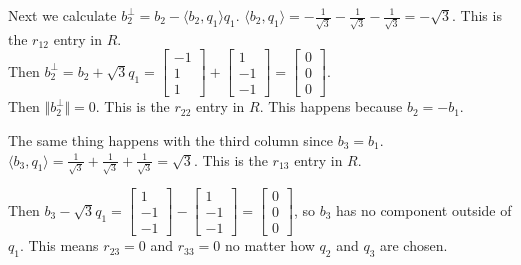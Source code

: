 \documentclass[11pt]{article}
\begin{document}
\noindent Next we calculate $b_2^{\perp}=b_2-\langle b_2,q_1\rangle q_1$. \quad $\langle b_2,q_1\rangle=-\frac{1}{\sqrt3}-\frac{1}{\sqrt3}-\frac{1}{\sqrt3} = -\sqrt3$. This is the $r_{12}$ entry in $R$.\\
Then $b_2^{\perp} = b_2+\sqrt3q_1=\begin{bmatrix}
    -1\\1\\1
\end{bmatrix}+\begin{bmatrix}
    1\\-1\\-1
\end{bmatrix}= \begin{bmatrix}
    0\\0\\0
\end{bmatrix}$.\\ 
Then $\Vert b_2^{\perp} \Vert = 0$. This is the $r_{22}$ entry in $R$. This happens because $b_2 = -b_1$.\\
\medskip

\noindent The same thing happens with the third column since $b_3 = b_1$.\\
$\langle b_3,q_1\rangle=\frac{1}{\sqrt3}+\frac{1}{\sqrt3}+\frac{1}{\sqrt3} = \sqrt3$. This is the $r_{13}$ entry in $R$.

\noindent Then $b_3 - \sqrt3q_1=\begin{bmatrix}
    1\\-1\\-1
\end{bmatrix}-\begin{bmatrix}
    1\\-1\\-1
\end{bmatrix}= \begin{bmatrix}
    0\\0\\0
\end{bmatrix}$, so $b_3$ has no component outside of $q_1$. This means $r_{23} = 0$ and $r_{33} = 0$ no matter how $q_2$ and $q_3$ are chosen.\\
\medskip
\end{document}
